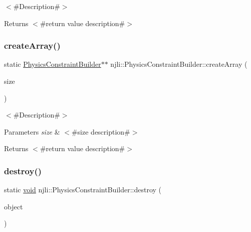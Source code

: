 $<$\#\+Description\#$>$

\begin{DoxyReturn}{Returns}
$<$\#return value description\#$>$ 
\end{DoxyReturn}
\mbox{\label{classnjli_1_1_physics_constraint_builder_a4a480262ca76e42e7abb72acc1b3f3c4}} 
\subsubsection{\texorpdfstring{create\+Array()}{createArray()}}
{\footnotesize\ttfamily static \mbox{\hyperlink{classnjli_1_1_physics_constraint_builder}{Physics\+Constraint\+Builder}}$\ast$$\ast$ njli\+::\+Physics\+Constraint\+Builder\+::create\+Array (\begin{DoxyParamCaption}\item[{const \mbox{\hyperlink{_util_8h_a10e94b422ef0c20dcdec20d31a1f5049}{u32}}}]{size }\end{DoxyParamCaption})\hspace{0.3cm}{\ttfamily [static]}}

$<$\#\+Description\#$>$


\begin{DoxyParams}{Parameters}
{\em size} & $<$\#size description\#$>$\\
\hline
\end{DoxyParams}
\begin{DoxyReturn}{Returns}
$<$\#return value description\#$>$ 
\end{DoxyReturn}
\mbox{\label{classnjli_1_1_physics_constraint_builder_a5edda7adc4b144130a1fbbe2651a0534}} 
\subsubsection{\texorpdfstring{destroy()}{destroy()}}
{\footnotesize\ttfamily static \mbox{\hyperlink{_thread_8h_af1e856da2e658414cb2456cb6f7ebc66}{void}} njli\+::\+Physics\+Constraint\+Builder\+::destroy (\begin{DoxyParamCaption}\item[{\mbox{\hyperlink{classnjli_1_1_physics_constraint_builder}{Physics\+Constraint\+Builder}} $\ast$}]{object }\end{DoxyParamCaption})\hspace{0.3cm}{\ttfamily [static]}}

